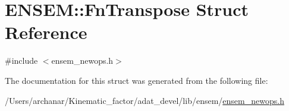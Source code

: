 \hypertarget{structENSEM_1_1FnTranspose}{}\section{E\+N\+S\+EM\+:\+:Fn\+Transpose Struct Reference}
\label{structENSEM_1_1FnTranspose}


{\ttfamily \#include $<$ensem\+\_\+newops.\+h$>$}



The documentation for this struct was generated from the following file\+:\begin{DoxyCompactItemize}
\item 
/\+Users/archanar/\+Kinematic\+\_\+factor/adat\+\_\+devel/lib/ensem/\mbox{\hyperlink{lib_2ensem_2ensem__newops_8h}{ensem\+\_\+newops.\+h}}\end{DoxyCompactItemize}
